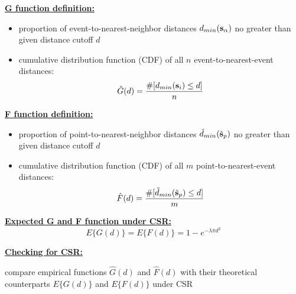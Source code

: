 \documentclass[portrait]{seminar}
\begin{document}
%
%
\begin{slide*}
\begin{center}
 \vspace*{-0.5cm} 
\end{center}

\vspace{0.3cm} \underline{\textbf{G function definition:}}
\begin{itemize}
\item proportion of event-to-nearest-neighbor distances
$d_{min}({\bf s}_\alpha)$ no greater than given distance cutoff $d$
\item cumulative distribution function (CDF)
of all $n$ event-to-nearest-event distances:
\[
\hat{G}(d) = \frac{ \# [ d_{min}({\bf s}_i) \leq d] }{n}
\]
\end{itemize}

\vspace{0.3cm} \underline{\textbf{F function definition:}}
\begin{itemize}
\item proportion of point-to-nearest-neighbor distances
$\tilde{d}_{min}(\tilde{{\bf s}}_p)$ no greater than given distance
cutoff $d$
\item cumulative distribution function (CDF)
of all $m$ point-to-nearest-event distances:
\[
\hat{F}(d) = \frac{ \# [ \tilde{d}_{min}(\tilde{{\bf s}}_p) \leq d]
}{m}
\]
\end{itemize}

\vspace{0.3cm} \underline{\textbf{Expected G and F function under
CSR:}}
\[E\{G(d)\} =
E\{F(d)\} = 1 - e^{-\lambda \pi d^2 }\]

\vspace{0.1cm} \underline{\textbf{Checking for CSR:}}

compare empirical functions $\hat{G}(d)$ and $\hat{F}(d)$ with their
theoretical counterparts $E\{ G(d) \}$ and $E\{ F(d) \}$ under CSR


\end{slide*}
\end{document}

